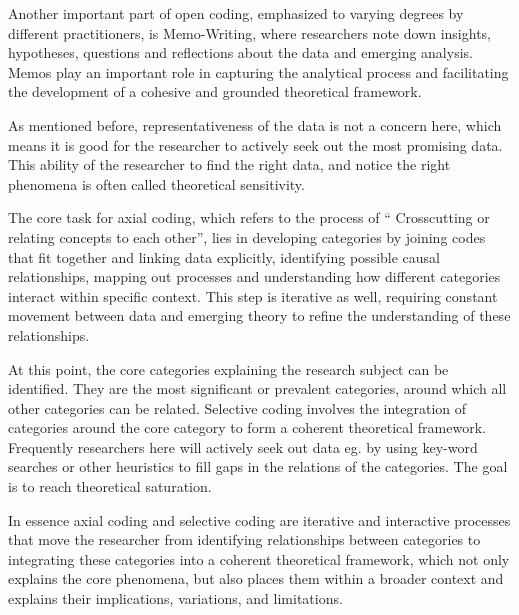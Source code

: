 Another important part of open coding, emphasized to varying degrees by different practitioners, is Memo-Writing,
where researchers note down insights, hypotheses, questions and reflections about the data and emerging analysis.
Memos play an important role in capturing the analytical process and facilitating the development of a cohesive and
grounded theoretical framework.

As mentioned before, representativeness of the data is not a concern here, which means it is good for the researcher
to actively seek out the most promising data. This ability of the researcher to find the right data, and notice the
right phenomena is often called theoretical sensitivity.

The core task for axial coding, which refers to the process of “ Crosscutting or relating concepts to each other”\cite[p.195]{corbin_basics_2015},
lies in developing categories by joining codes that fit together and linking data
explicitly, identifying possible causal relationships, mapping out processes and understanding how different categories
interact within specific context. This step is iterative as well, requiring constant
movement between data and emerging theory to refine the understanding of these relationships.

At this point, the core categories explaining the research subject can be identified. They are the most significant or
prevalent categories, around which all other categories can be related. Selective coding involves the integration of
categories around the core category to form a coherent theoretical framework. Frequently researchers here will actively
seek out data eg. by using key-word searches or other heuristics to fill gaps in the relations of the categories.
The goal is to reach theoretical saturation.

In essence axial coding and selective coding are iterative and interactive processes that move the researcher from
identifying relationships between categories to integrating these categories into a coherent theoretical framework,
which not only explains the core phenomena, but also places them within a broader context and explains their implications,
variations, and limitations.
